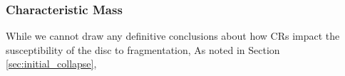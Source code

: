 \subsubsection{Characteristic Mass}

While we cannot draw any definitive conclusions about how CRs impact the susceptibility of the disc to fragmentation, 
As noted in Section \ref{sec:initial_collapse}, 